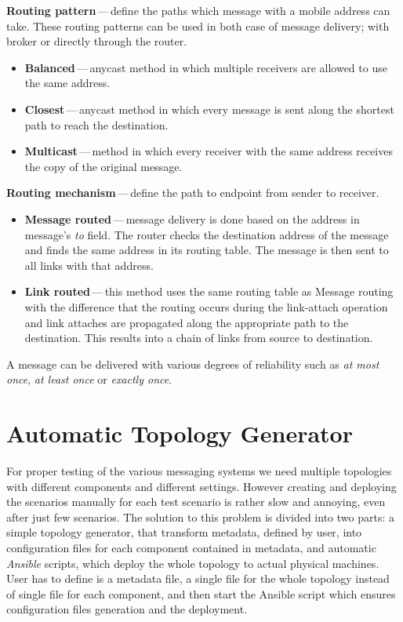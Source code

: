 \begin{description}
	\setlength\itemsep{0em}
	\item \textbf{Routing pattern}\,---\,define the paths which message with a mobile address can take. These routing patterns can be used in both case of message delivery; with broker or directly through the router.
	\begin{itemize}
		\setlength\itemsep{0em}
		\item \textbf{Balanced}\,---\,anycast\footnotemark{} method in which multiple receivers are allowed to use the same address.
		\item \textbf{Closest}\,---\,anycast method in which every message is sent along the shortest path to reach the destination.
		\item \textbf{Multicast}\,---\,method in which every receiver with the same address receives the copy of the original message.
	\end{itemize}
	\item \textbf{Routing mechanism}\,---\,define the path to endpoint from sender to receiver.
	\begin{itemize}
		\setlength\itemsep{0em}
		\item \textbf{Message routed}\,---\,message delivery is done based on the address in message's \emph{to} field. The router checks the destination address of the message and finds the same address in its routing table. The message is then sent to all links with that address.
		\item \textbf{Link routed}\,---\,this method uses the same routing table as Message routing with the difference that the routing occurs during the link-attach operation and link attaches are propagated along the appropriate path to the destination. This results into a chain of links from source to destination.
	\end{itemize}
\end{description}
A message can be delivered with various degrees of reliability such as \emph{at most once}, \emph{at least once} or \emph{exactly once}.


\section{Automatic Topology Generator}
For proper testing of the various messaging systems we need multiple topologies with different components and different settings. However creating and deploying the scenarios manually for each test scenario is rather slow and annoying, even after just few scenarios. The solution to this problem is divided into two parts: a simple topology generator, that transform metadata, defined by user, into configuration files for each component contained in metadata, and automatic \emph{Ansible} scripts, which deploy the whole topology to actual physical machines. User has to define is a metadata file, a single file for the whole topology instead of single file for each component, and then start the Ansible script which ensures configuration files generation and the deployment.


